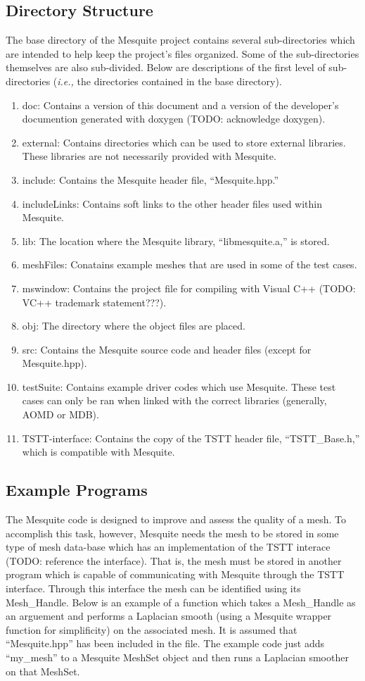 \documentclass[psfig]{article}
\begin{document}
\subsection{Directory Structure}


The base directory of the Mesquite project contains several
sub-directories which are intended to help keep the project's
files organized.  Some of the sub-directories themselves are
also sub-divided.  Below are descriptions of the first level
of sub-directories ({\it i.e.,} the directories contained in the
base directory).
\begin{enumerate}
\item doc:  Contains a version of this document and a version of
the developer's documention generated with doxygen (TODO: acknowledge
doxygen).
\item external:  Contains directories which can be used to store external
libraries.  These libraries are not necessarily provided with Mesquite.
\item include:  Contains the Mesquite header file, ``Mesquite.hpp.''
\item includeLinks:  Contains soft links to the other header files
used within Mesquite.  
\item lib:  The location where the Mesquite library, ``libmesquite.a,'' is
stored.
\item meshFiles:  Conatains example meshes that are used in some of
the test cases.
\item mswindow:  Contains the project file for compiling with Visual C++
(TODO: VC++ trademark statement???).
\item obj:  The directory where the object files are placed.
\item src:  Contains the Mesquite source code and header files (except for
Mesquite.hpp).
\item testSuite:  Contains example driver codes which use Mesquite.  These
test cases can only be ran when linked with the correct libraries (generally,
AOMD or MDB).
\item TSTT-interface:  Contains the copy of the TSTT header file,
``TSTT\_Base.h,'' which is compatible with Mesquite.
\end{enumerate}
\subsection{Example Programs}
The Mesquite code is designed to improve and assess the quality of
a mesh.  To accomplish this task, however, Mesquite needs the mesh
to be stored in some type of mesh data-base which has an implementation
of the TSTT interace  (TODO: reference the interface).  That is, the
mesh must be stored in another program which is capable of communicating
with Mesquite through the TSTT interface.  Through this interface
the mesh can be identified using its Mesh\_Handle.  Below is an example
of a function which takes a Mesh\_Handle as an arguement and performs
a Laplacian smooth (using a Mesquite wrapper function for simplificity)
on the associated mesh.  It is assumed that ``Mesquite.hpp'' has been
included in the file.  The example code just adds ``my\_mesh'' to a
Mesquite MeshSet object and then runs a Laplacian smoother on that
MeshSet.
\end{document}
